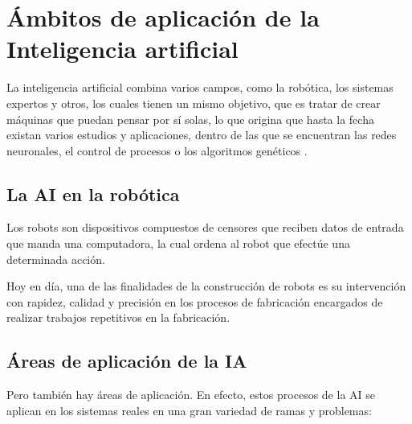 \section{\'Ambitos de aplicaci\'on de la Inteligencia artificial}

La inteligencia artificial combina varios campos, como la rob\'otica, los sistemas expertos y otros, los cuales tienen un mismo objetivo, que es tratar de crear m\'aquinas que puedan pensar por s\'i solas, lo que origina que hasta la fecha existan varios estudios y aplicaciones, dentro de las que se encuentran las redes neuronales, el control de procesos o los algoritmos gen\'eticos \citep{ambitos}.

\subsection{La AI en la rob\'otica}

Los robots son dispositivos compuestos de censores que reciben datos de entrada que manda una computadora, la cual ordena al robot que efect\'ue una determinada acci\'on.

Hoy en d\'ia, una de las finalidades de la construcci\'on de robots es su intervenci\'on con rapidez, calidad y precisi\'on en los procesos de fabricaci\'on encargados de realizar trabajos repetitivos en la fabricaci\'on.

\subsection{\'Areas de aplicaci\'on de la IA}

Pero tambi\'en hay \'areas de aplicaci\'on. En efecto, estos procesos de la AI se aplican en los sistemas reales en una gran variedad de ramas y problemas:


